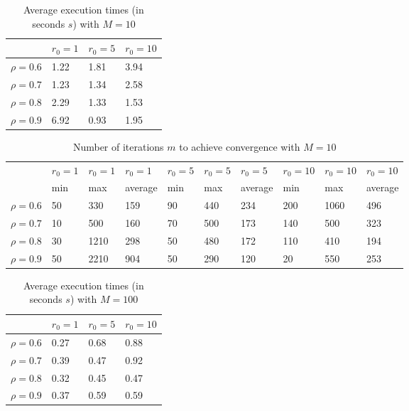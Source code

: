 \documentclass[a4paper,11pt,openright]{report}
\begin{document}
\begin{table}[H]
\centering
\addtolength{\leftskip}{-1.5cm}
\addtolength{\rightskip}{-1.5cm}
\begin{tabular}{|c|lll|}
\hline
$ $ & $r_0 = 1$ & $r_0 = 5$ & $r_0 = 10$ \\
\hline
$\rho = 0.6$ & 1.22 & 1.81 & 3.94 \\

$\rho = 0.7$ & 1.23 & 1.34 & 2.58 \\

$\rho = 0.8$ & 2.29 & 1.33 & 1.53 \\

$\rho = 0.9$ & 6.92 & 0.93 & 1.95 \\
\hline
\end{tabular}
\caption{Average execution
 times (in seconds $s$) with $M = 10$}
\end{table}
\begin{table}[H]
\centering
\addtolength{\leftskip}{-1.5cm}
\addtolength{\rightskip}{-1.5cm}
\begin{tabular}{|c|lllllllll|}
\hline
$ $ & $r_0 = 1$ & $r_0 = 1$ & $r_0 = 1$ & $r_0 = 5$ & $r_0 = 5$ & $r_0 = 5$ & $r_0 = 10$ & $r_0 = 10$ & $r_0 = 10$  \\
$ $ & min & max & average & min & max & average & min & max & average \\ 
\hline
$\rho = 0.6$ & 50 & 330 & 159 & 90 & 440 & 234 & 200 & 1060 & 496 \\

$\rho = 0.7$ & 10 & 500 & 160 & 70 & 500 & 173 & 140 & 500 & 323\\

$\rho = 0.8$ & 30 & 1210 & 298 & 50 & 480 & 172 & 110 & 410 & 194\\

$\rho = 0.9$ & 50 & 2210 & 904 & 50 & 290 & 120 & 20 & 550 & 253\\
\hline
\end{tabular}
\caption{Number of iterations $m$ to achieve convergence with $M = 10$}
\end{table}
\begin{table}[H]
\centering
\addtolength{\leftskip}{-1.5cm}
\addtolength{\rightskip}{-1.5cm}
\begin{tabular}{|c|lll|}
\hline
$ $ & $r_0 = 1$ & $r_0 = 5$ & $r_0 = 10$ \\
\hline
$\rho = 0.6$ & 0.27 & 0.68 & 0.88 \\

$\rho = 0.7$ & 0.39 & 0.47 & 0.92 \\

$\rho = 0.8$ & 0.32 & 0.45 & 0.47 \\

$\rho = 0.9$ & 0.37 & 0.59 &  0.59 \\
\hline
\end{tabular}
\caption{Average execution
 times (in seconds $s$) with $M = 100$}
\end{table}
\end{document}

